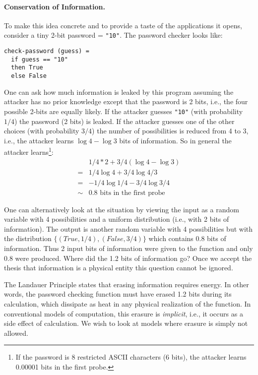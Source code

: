 \documentclass{article}
\begin{document}
\paragraph*{Conservation of Information.}
To make this idea concrete and to provide a taste of the applications
it opens, consider a tiny 2-bit password = \verb|"10"|. The password
checker looks like:

\begin{verbatim}
check-password (guess) =
  if guess == "10"
  then True
  else False
\end{verbatim}

One can ask how much information is leaked by this program assuming
the attacker has no prior knowledge except that the password is 2
bits, i.e., the four possible 2-bits are equally likely. If the
attacker guesses \verb|"10"| (with probability $1/4$) the password (2
bits) is leaked. If the attacker guesses one of the other choices
(with probability $3/4$) the number of possibilities is reduced from 4
to 3, i.e., the attacker learns $\log{4} - \log{3}$ bits of
information. So in general the attacker learns\footnote{If the
  password is 8 restricted ASCII characters (6 bits), the attacker
  learns 0.00001 bits in the first probe.}:
\[\begin{array}{ll}
   &  1/4 * 2 + 3/4 (\log{4} - \log{3}) \\
  =&  1/4 \log{4} + 3/4 \log{4/3} \\
  =&  - 1/4 \log{1/4} - 3/4 \log{3/4} \\
  \sim& 0.8 \mbox{~bits~in~the~first~probe}
\end{array}\]

One can alternatively look at the situation by viewing the input as a
random variable with 4 possibilities and a uniform distribution (i.e.,
with 2 bits of information). The output is another random variable
with 4 possibilities but with the distribution
$\{ (True, 1/4), (False, 3/4) \}$ which contains 0.8 bits of
information. Thus 2 input bits of information were given to the
function and only 0.8 were produced. Where did the 1.2 bits of
information go? Once we accept the thesis that information is a
physical entity this question cannot be ignored.

The Landauer Principle states that erasing information requires
energy. In other words, the password checking function must have
erased 1.2 bits during its calculation, which dissipate as heat in any
physical realization of the function. In conventional models of
computation, this erasure is \emph{implicit}, i.e., it occurs as a
side effect of calculation. We wish to look at models where
erasure is simply not allowed.
\end{document}
